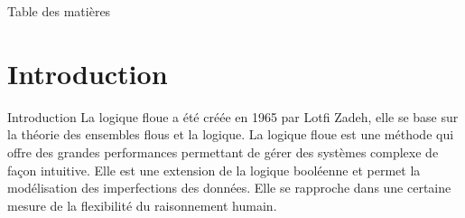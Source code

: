 \documentclass[aspectratio=169,professionalfonts, 12pt]{beamer}
\date{\today}
\begin{document}

\begin{frame}[plain]
  \titlepage
\end{frame}

  

  \begin{frame}[plain]{Table des matières}
    \tableofcontents
  \end{frame}

\section{Introduction}

\begin{frame}{Introduction}
  La logique floue a été créée en 1965 par Lotfi Zadeh, elle se base sur la théorie
  des ensembles flous et la logique. La logique floue est une méthode qui offre des grandes
  performances permettant de gérer des systèmes complexe de façon intuitive. Elle est
  une extension de la logique booléenne et permet la modélisation des imperfections des données.
  Elle se rapproche dans une certaine mesure de la flexibilité du raisonnement humain.
\end{frame}
\end{document}
